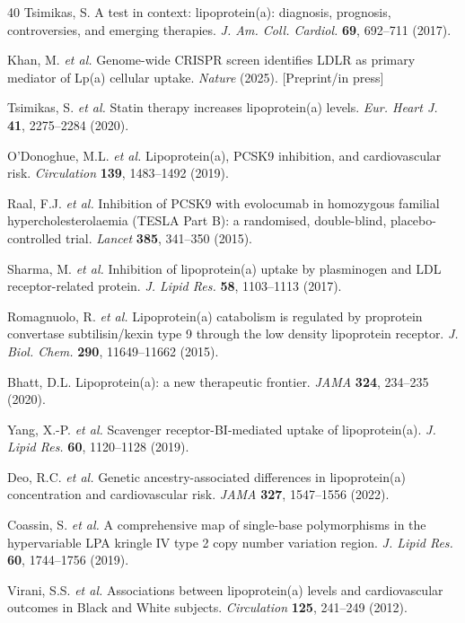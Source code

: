 \documentclass[11pt,a4paper]{article}
\begin{document}
\begin{thebibliography}{40}
 Tsimikas, S. A test in context: lipoprotein(a): diagnosis, prognosis, controversies, and emerging therapies. \textit{J. Am. Coll. Cardiol.} \textbf{69}, 692--711 (2017).

 Khan, M. \textit{et al.} Genome-wide CRISPR screen identifies LDLR as primary mediator of Lp(a) cellular uptake. \textit{Nature} (2025). [Preprint/in press]

 Tsimikas, S. \textit{et al.} Statin therapy increases lipoprotein(a) levels. \textit{Eur. Heart J.} \textbf{41}, 2275--2284 (2020).

 O'Donoghue, M.L. \textit{et al.} Lipoprotein(a), PCSK9 inhibition, and cardiovascular risk. \textit{Circulation} \textbf{139}, 1483--1492 (2019).

 Raal, F.J. \textit{et al.} Inhibition of PCSK9 with evolocumab in homozygous familial hypercholesterolaemia (TESLA Part B): a randomised, double-blind, placebo-controlled trial. \textit{Lancet} \textbf{385}, 341--350 (2015).

 Sharma, M. \textit{et al.} Inhibition of lipoprotein(a) uptake by plasminogen and LDL receptor-related protein. \textit{J. Lipid Res.} \textbf{58}, 1103--1113 (2017).

 Romagnuolo, R. \textit{et al.} Lipoprotein(a) catabolism is regulated by proprotein convertase subtilisin/kexin type 9 through the low density lipoprotein receptor. \textit{J. Biol. Chem.} \textbf{290}, 11649--11662 (2015).

 Bhatt, D.L. Lipoprotein(a): a new therapeutic frontier. \textit{JAMA} \textbf{324}, 234--235 (2020).

 Yang, X.-P. \textit{et al.} Scavenger receptor-BI-mediated uptake of lipoprotein(a). \textit{J. Lipid Res.} \textbf{60}, 1120--1128 (2019).

 Deo, R.C. \textit{et al.} Genetic ancestry-associated differences in lipoprotein(a) concentration and cardiovascular risk. \textit{JAMA} \textbf{327}, 1547--1556 (2022).

 Coassin, S. \textit{et al.} A comprehensive map of single-base polymorphisms in the hypervariable LPA kringle IV type 2 copy number variation region. \textit{J. Lipid Res.} \textbf{60}, 1744--1756 (2019).

 Virani, S.S. \textit{et al.} Associations between lipoprotein(a) levels and cardiovascular outcomes in Black and White subjects. \textit{Circulation} \textbf{125}, 241--249 (2012).


\end{thebibliography}
\end{document}
